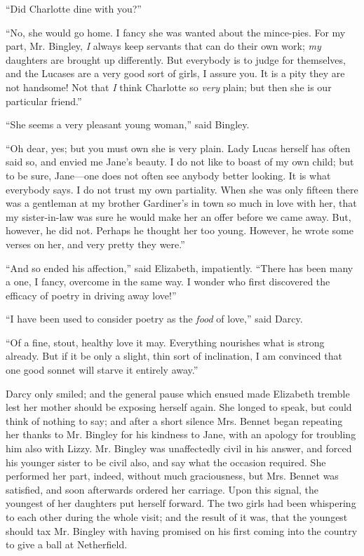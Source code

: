 ``Did Charlotte dine with you?''

``No, she would go home. I fancy she was wanted about the mince-pies. For my part, Mr. Bingley, \textit{I} always keep servants that can do their own work; \textit{my} daughters are brought up differently. But everybody is to judge for themselves, and the Lucases are a very good sort of girls, I assure you. It is a pity they are not handsome! Not that \textit{I} think Charlotte so \textit{very} plain; but then she is our particular friend.''

``She seems a very pleasant young woman,'' said Bingley.

``Oh dear, yes; but you must own she is very plain. Lady Lucas herself has often said so, and envied me Jane's beauty. I do not like to boast of my own child; but to be sure, Jane---one does not often see anybody better looking. It is what everybody says. I do not trust my own partiality. When she was only fifteen there was a gentleman at my brother Gardiner's in town so much in love with her, that my sister-in-law was sure he would make her an offer before we came away. But, however, he did not. Perhaps he thought her too young. However, he wrote some verses on her, and very pretty they were.''

``And so ended his affection,'' said Elizabeth, impatiently. ``There has been many a one, I fancy, overcome in the same way. I wonder who first discovered the efficacy of poetry in driving away love!''

``I have been used to consider poetry as the \textit{food} of love,'' said Darcy.

``Of a fine, stout, healthy love it may. Everything nourishes what is strong already. But if it be only a slight, thin sort of inclination, I am convinced that one good sonnet will starve it entirely away.''

Darcy only smiled; and the general pause which ensued made Elizabeth tremble lest her mother should be exposing herself again. She longed to speak, but could think of nothing to say; and after a short silence Mrs. Bennet began repeating her thanks to Mr. Bingley for his kindness to Jane, with an apology for troubling him also with Lizzy. Mr. Bingley was unaffectedly civil in his answer, and forced his younger sister to be civil also, and say what the occasion required. She performed her part, indeed, without much graciousness, but Mrs. Bennet was satisfied, and soon afterwards ordered her carriage. Upon this signal, the youngest of her daughters put herself forward. The two girls had been whispering to each other during the whole visit; and the result of it was, that the youngest should tax Mr. Bingley with having promised on his first coming into the country to give a ball at Netherfield.

